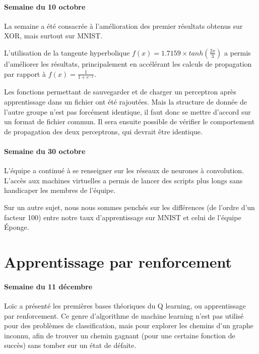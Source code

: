 \documentclass[
    10pt,
    a4paper,
    oneside,
    headinclude,footinclude,
    BCOR=5mm,
    captions=tableabove
]{scrartcl}
\begin{document}
\paragraph{Semaine du 10 octobre}

La semaine a été consacrée à l'amélioration des premier résultats obtenus sur XOR, mais surtout sur MNIST.

L'utilisation de la tangente hyperbolique $f(x) = 1.7159 \times tanh(\frac{2x}{3})$ a permis d'améliorer les résultats, principalement en accélérant les calculs de propagation par rapport à $f(x) = \frac{1}{1 + e^{-x}}$.

Les fonctions permettant de sauvegarder et de charger un perceptron après apprentissage dans un fichier ont été rajoutées. Mais la structure de donnée de l'autre groupe n'est pas forcément identique, il faut donc se mettre d'accord sur un format de fichier commun. Il sera ensuite possible de vérifier le comportement de propagation des deux perceptrons, qui devrait être identique.

\paragraph{Semaine du 30 octobre}

L'équipe a continué à se renseigner sur les réseaux de neurones à convolution. L'accès aux machines virtuelles a permis de lancer des scripts plus longs sans handicaper les membres de l'équipe.

Sur un autre sujet, nous nous sommes penchés sur les différences (de l'ordre d'un facteur 100) entre notre taux d'apprentissage sur MNIST et celui de l'équipe Éponge.

\section{Apprentissage par renforcement}

\paragraph{Semaine du 11 décembre}

Loïc a présenté les premières bases théoriques du Q learning, ou apprentissage par renforcement. Ce genre d'algorithme de machine learning n'est pas utilisé pour des problèmes de classification, mais pour explorer les chemins d'un graphe inconnu, afin de trouver un chemin gagnant (pour une certaine fonction de succès) sans tomber sur un état de défaite.
\end{document}
